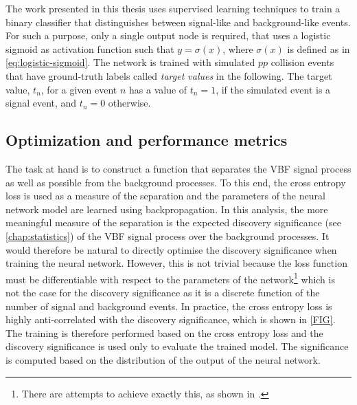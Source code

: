 The work presented in this thesis uses supervised learning techniques to train a binary classifier that distinguishes between signal-like and background-like events. 
For such a purpose, only a single output node is required, that uses a logistic sigmoid as activation function such that $y = \sigma(x)$, where $\sigma(x)$ is defined as in \cref{eq:logistic-sigmoid}.
The network is trained with simulated $pp$ collision events that have ground-truth labels called \emph{target values} in the following. The target value, $t_n$, for a given event $n$ has a value of $t_n = 1$, if the simulated event is a signal event, and $t_n = 0$ otherwise.


\subsection{Optimization and performance metrics}
The task at hand is to construct a function that separates the VBF signal process as well as possible from the background processes.
To this end, the cross entropy loss is used as a measure of the separation and the parameters of the neural network model are learned using backpropagation.
In this analysis, the more meaningful measure of the separation is the expected discovery significance (see \cref{chap:statistics}) of the VBF signal process over the background processes. 
It would therefore be natural to directly optimise the discovery significance when training the neural network. 
However, this is not trivial because the loss function must be differentiable with respect to the parameters of the network\footnote{There are attempts to achieve exactly this, as shown in .} which is not the case for the discovery significance as it is a discrete function of the number of signal and background events. 
In practice, the cross entropy loss is highly anti-correlated with the discovery significance, which is shown in \cref{FIG}.
The training is therefore performed based on the cross entropy loss and the discovery significance is used only to evaluate the trained model. The significance is computed based on the distribution of the output of the neural network. 

